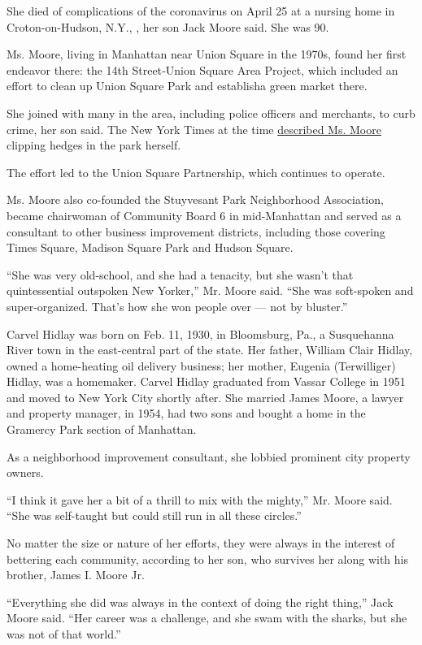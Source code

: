 She died of complications of the coronavirus on April 25 at a nursing
home in Croton-on-Hudson, N.Y., , her son Jack Moore said. She was 90.

Ms. Moore, living in Manhattan near Union Square in the 1970s, found her
first endeavor there: the 14th Street‐Union Square Area Project, which
included an effort to clean up Union Square Park and establisha green
market there.

She joined with many in the area, including police officers and
merchants, to curb crime, her son said. The New York Times at the time
\href{https://www.nytimes.com/1977/05/19/archives/project-aimed-at-sprucing-union-square.html}{described
Ms. Moore} clipping hedges in the park herself.

The effort led to the Union Square Partnership, which continues to
operate.

Ms. Moore also co-founded the Stuyvesant Park Neighborhood Association,
became chairwoman of Community Board 6 in mid-Manhattan and served as a
consultant to other business improvement districts, including those
covering Times Square, Madison Square Park and Hudson Square.

``She was very old-school, and she had a tenacity, but she wasn't that
quintessential outspoken New Yorker,'' Mr. Moore said. ``She was
soft-spoken and super-organized. That's how she won people over --- not
by bluster.''

Carvel Hidlay was born on Feb. 11, 1930, in Bloomsburg, Pa., a
Susquehanna River town in the east-central part of the state. Her
father, William Clair Hidlay, owned a home-heating oil delivery
business; her mother, Eugenia (Terwilliger) Hidlay, was a homemaker.
Carvel Hidlay graduated from Vassar College in 1951 and moved to New
York City shortly after. She married James Moore, a lawyer and property
manager, in 1954, had two sons and bought a home in the Gramercy Park
section of Manhattan.

As a neighborhood improvement consultant, she lobbied prominent city
property owners.

``I think it gave her a bit of a thrill to mix with the mighty,'' Mr.
Moore said. ``She was self-taught but could still run in all these
circles.''

No matter the size or nature of her efforts, they were always in the
interest of bettering each community, according to her son, who survives
her along with his brother, James I. Moore Jr.

``Everything she did was always in the context of doing the right
thing,'' Jack Moore said. ``Her career was a challenge, and she swam
with the sharks, but she was not of that world.''


